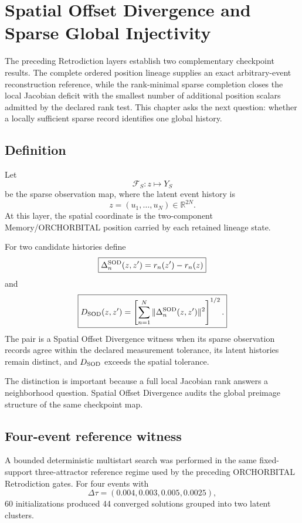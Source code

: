 \chapter{Spatial Offset Divergence and Sparse Global Injectivity}

The preceding Retrodiction layers establish two complementary checkpoint results. The complete ordered position lineage supplies an exact arbitrary-event reconstruction reference, while the rank-minimal sparse completion closes the local Jacobian deficit with the smallest number of additional position scalars admitted by the declared rank test. This chapter asks the next question: whether a locally sufficient sparse record identifies one global history.

\section{Definition}

Let
\[
\mathcal F_S:z\mapsto Y_S
\]
be the sparse observation map, where the latent event history is
\[
z=(u_1,\ldots,u_N)\in\mathbb R^{2N}.
\]
At this layer, the spatial coordinate is the two-component Memory/ORCHORBITAL position carried by each retained lineage state.

For two candidate histories define
\[
\boxed{
\Delta_n^{\rm SOD}(z,z')=r_n(z')-r_n(z)
}
\]
and
\[
\boxed{
D_{\rm SOD}(z,z')
=
\left[
\sum_{n=1}^{N}
\|\Delta_n^{\rm SOD}(z,z')\|^2
\right]^{1/2}.
}
\]
The pair is a Spatial Offset Divergence witness when its sparse observation records agree within the declared measurement tolerance, its latent histories remain distinct, and $D_{\rm SOD}$ exceeds the spatial tolerance.

The distinction is important because a full local Jacobian rank answers a neighborhood question. Spatial Offset Divergence audits the global preimage structure of the same checkpoint map.

\section{Four-event reference witness}

A bounded deterministic multistart search was performed in the same fixed-support three-attractor reference regime used by the preceding ORCHORBITAL Retrodiction gates. For four events with
\[
\Delta\tau=(0.004,0.003,0.005,0.0025),
\]
60 initializations produced 44 converged solutions grouped into two latent clusters.

